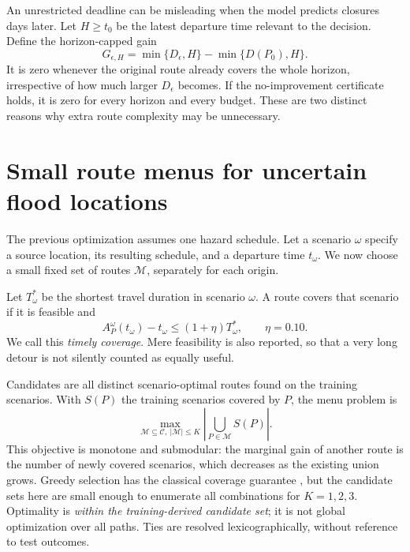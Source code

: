 \documentclass[11pt]{article}
\begin{document}
An unrestricted deadline can be misleading when the model predicts closures days later. Let $H\ge t_0$ be the latest departure time relevant to the decision. Define the horizon-capped gain
\begin{equation}
 G_{\epsilon,H}
 =\min\{D_\epsilon,H\}-\min\{D(P_0),H\}.
 \label{eq:horizon}
\end{equation}
It is zero whenever the original route already covers the whole horizon, irrespective of how much larger $D_\epsilon$ becomes. If the no-improvement certificate holds, it is zero for every horizon and every budget. These are two distinct reasons why extra route complexity may be unnecessary.

\section{Small route menus for uncertain flood locations}
\label{sec:menus}
The previous optimization assumes one hazard schedule. Let a scenario $\omega$ specify a source location, its resulting schedule, and a departure time $t_\omega$. We now choose a small fixed set of routes $\mathcal M$, separately for each origin.

Let $T_\omega^*$ be the shortest travel duration in scenario $\omega$. A route covers that scenario if it is feasible and
\begin{equation}
 A^\omega_P(t_\omega)-t_\omega\le(1+\eta)T_\omega^*,
 \qquad\eta=0.10.
 \label{eq:cover}
\end{equation}
We call this \emph{timely coverage}. Mere feasibility is also reported, so that a very long detour is not silently counted as equally useful.

Candidates are all distinct scenario-optimal routes found on the training scenarios. With $S(P)$ the training scenarios covered by $P$, the menu problem is
\begin{equation}
 \max_{\mathcal M\subseteq\mathcal C,\ |\mathcal M|\le K}
 \left|\bigcup_{P\in\mathcal M}S(P)\right|.
 \label{eq:menu}
\end{equation}
This objective is monotone and submodular: the marginal gain of another route is the number of newly covered scenarios, which decreases as the existing union grows. Greedy selection has the classical coverage guarantee \cite{nemhauser}, but the candidate sets here are small enough to enumerate all combinations for $K=1,2,3$. Optimality is \emph{within the training-derived candidate set}; it is not global optimization over all paths. Ties are resolved lexicographically, without reference to test outcomes.
\end{document}
